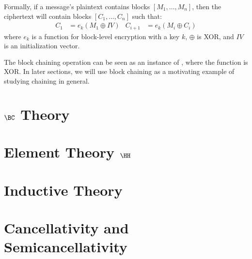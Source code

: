 Formally, if a message's plaintext contains blocks $[M_1, \dotsc, M_n]$, then
the ciphertext will contain blocks $[C_1, \dotsc, C_n]$ such that:
\begin{align*}
    C_1 &= e_k(M_1 \oplus IV) &
    C_{i+1} &= e_k(M_i \oplus C_i)
\end{align*}
where $e_k$ is a function for block-level encryption with a key $k$, $\oplus$
is XOR, and $IV$ is an initialization vector.

The block chaining operation can be seen as an instance of , where
the function is XOR. In later sections, we will use block chaining as a
motivating example of studying chaining in general.

\section{\texorpdfstring{$\BC$}{BC} Theory}\label{sec:bc-theory}

\section{Element Theory \texorpdfstring{$\HH$}{H}}\label{sec:elt-theory}

\section{Inductive Theory}\label{sec:inductive-theory}

\section{Cancellativity and Semicancellativity}\label{sec:cancel}

